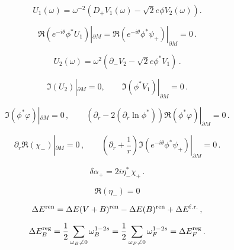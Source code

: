 \documentclass[]{article}
\begin{document}
\begin{equation}
	U_1(\omega ) =\omega^{-2} \left( D_+ V_1(\omega ) 
	-\sqrt{2} e \phi V_2(\omega ) \right).
	\label{U1VV}
\end{equation}

\begin{equation}
	\Re \left( e^{-i\theta}\phi^* U_1 \right)|_{\partial M}=
	\Re \left( e^{-i\theta}\phi^* \psi_+ \right)|_{\partial M}=
	0\,.\label{bcU1D}
\end{equation}

\begin{equation}
	U_2(\omega )=\omega^2 \left( \partial_- V_2 
	-\sqrt{2} e\phi^* V_1 \right)\,.
	\label{U2VV}
\end{equation}

\begin{equation}
	\Im \left( U_2 \right)|_{\partial M}=0,\qquad
	\Im \left( \phi^* V_1 \right)|_{\partial M}=0 \,.
	\label{bcU2V1}
\end{equation}










\begin{equation}
	\Im \left( \phi^* \varphi \right)|_{\partial M}=0 \,,\qquad
	\left( \partial_r -2(\partial_r \ln \phi^* ) \right)\Re 
	\left( \phi^* \varphi \right)|_{\partial M}=0 \,.\label{bcphi}
\end{equation}

\begin{equation}
	\partial_r \Re (\chi_-)|_{\partial M}=0\,,\qquad
	\left( \partial_r +\frac 1r \right) 
	\Im \left( e^{-i\theta} \phi^* \psi_+ \right)|_{\partial M}=0\,.
	\label{bcUUN}
\end{equation}

\begin{equation}
	\delta \alpha_+ =2i\eta_-^* \chi_+ \,.\label{delap}
\end{equation}

\begin{equation}
	\Re (\eta_-) =0 \label{Imeta}
\end{equation}

\begin{equation}
	\Delta E^{\rm ren} = \Delta E(V+B)^{\rm ren} - \Delta E (B)^{\rm
		ren} + \Delta E^{\rm f.r.} \,,\label{DE3DE}
\end{equation}

\begin{equation}
	\Delta E_B^{\rm reg} = \frac 12 \sum_{\omega_B\ne 0}
	\omega_B^{1-2s} =\frac 12 \sum_{\omega_F\ne 0} \omega_F^{1-2s} =
	\Delta E_F^{\rm reg} \,.\label{DEBDEF}
\end{equation}
\end{document}
